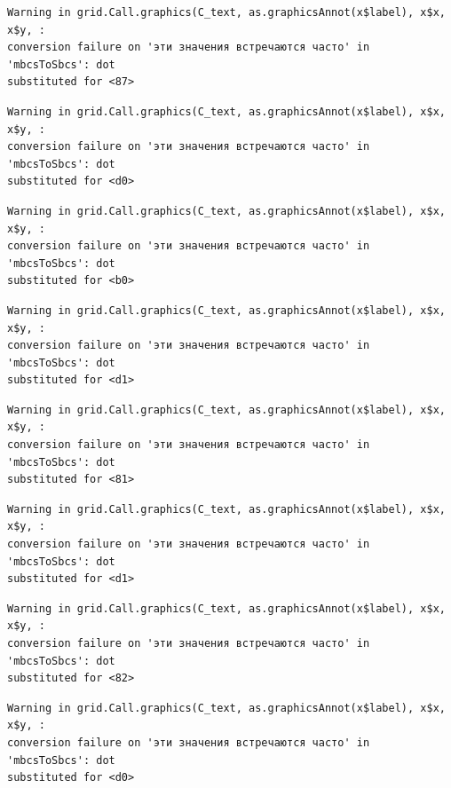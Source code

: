 \documentclass[
  letterpaper,
  DIV=11,
  numbers=noendperiod]{scrreprt}
\theoremstyle{definition}
\theoremstyle{remark}
\begin{document}
\begin{verbatim}
Warning in grid.Call.graphics(C_text, as.graphicsAnnot(x$label), x$x, x$y, :
conversion failure on 'эти значения встречаются часто' in 'mbcsToSbcs': dot
substituted for <87>
\end{verbatim}

\begin{verbatim}
Warning in grid.Call.graphics(C_text, as.graphicsAnnot(x$label), x$x, x$y, :
conversion failure on 'эти значения встречаются часто' in 'mbcsToSbcs': dot
substituted for <d0>
\end{verbatim}

\begin{verbatim}
Warning in grid.Call.graphics(C_text, as.graphicsAnnot(x$label), x$x, x$y, :
conversion failure on 'эти значения встречаются часто' in 'mbcsToSbcs': dot
substituted for <b0>
\end{verbatim}

\begin{verbatim}
Warning in grid.Call.graphics(C_text, as.graphicsAnnot(x$label), x$x, x$y, :
conversion failure on 'эти значения встречаются часто' in 'mbcsToSbcs': dot
substituted for <d1>
\end{verbatim}

\begin{verbatim}
Warning in grid.Call.graphics(C_text, as.graphicsAnnot(x$label), x$x, x$y, :
conversion failure on 'эти значения встречаются часто' in 'mbcsToSbcs': dot
substituted for <81>
\end{verbatim}

\begin{verbatim}
Warning in grid.Call.graphics(C_text, as.graphicsAnnot(x$label), x$x, x$y, :
conversion failure on 'эти значения встречаются часто' in 'mbcsToSbcs': dot
substituted for <d1>
\end{verbatim}

\begin{verbatim}
Warning in grid.Call.graphics(C_text, as.graphicsAnnot(x$label), x$x, x$y, :
conversion failure on 'эти значения встречаются часто' in 'mbcsToSbcs': dot
substituted for <82>
\end{verbatim}

\begin{verbatim}
Warning in grid.Call.graphics(C_text, as.graphicsAnnot(x$label), x$x, x$y, :
conversion failure on 'эти значения встречаются часто' in 'mbcsToSbcs': dot
substituted for <d0>
\end{verbatim}
\end{document}
